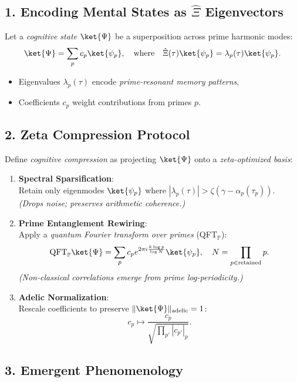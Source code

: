 \documentclass[12pt]{article}
\theoremstyle{plain}
\begin{document}
\subsection*{1. Encoding Mental States as \(\hat{\Xi}\) Eigenvectors}

Let a \emph{cognitive state} \( \ket{\Psi} \) be a superposition across prime harmonic modes:
\[
\ket{\Psi} = \sum_p c_p \ket{\psi_p}, \quad \text{where} \quad \hat{\Xi}(\tau) \ket{\psi_p} = \lambda_p(\tau) \ket{\psi_p}.
\]
\begin{itemize}
    \item Eigenvalues \( \lambda_p(\tau) \) encode \emph{prime-resonant memory patterns},
    \item Coefficients \( c_p \) weight contributions from primes \( p \).
\end{itemize}

\subsection*{2. Zeta Compression Protocol}

Define \emph{cognitive compression} as projecting \( \ket{\Psi} \) onto a \emph{zeta-optimized basis}:

\begin{enumerate}
    \item \textbf{Spectral Sparsification}:\\
    Retain only eigenmodes \( \ket{\psi_p} \) where \( |\lambda_p(\tau)| > \zeta(\gamma - \alpha_p(\tau_p)) \).\\
    \emph{(Drops noise; preserves arithmetic coherence.)}

    \item \textbf{Prime Entanglement Rewiring}:\\
    Apply a \emph{quantum Fourier transform over primes} (QFT\(_\mathbb{P}\)):
    \[
    \text{QFT}_\mathbb{P} \ket{\Psi} = \sum_p c_p e^{2\pi i \frac{k \log p}{\log N}} \ket{\psi_p}, \quad N = \prod_{p \in \text{retained}} p.
    \]
    \emph{(Non-classical correlations emerge from prime log-periodicity.)}

    \item \textbf{Adelic Normalization}:\\
    Rescale coefficients to preserve \( \| \ket{\Psi} \|_{\text{adelic}} = 1 \):
    \[
    c_p \mapsto \frac{c_p}{\sqrt{\prod_{p'} |c_{p'}|_p}}.
    \]
\end{enumerate}

\subsection*{3. Emergent Phenomenology}
\end{document}
